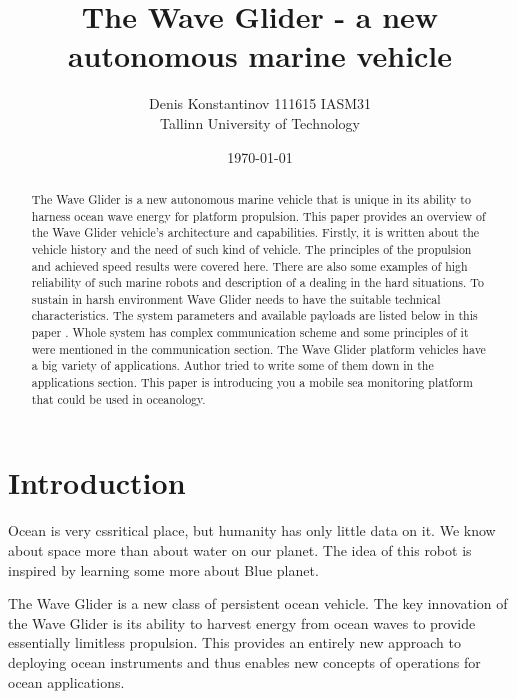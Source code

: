 
\title{The Wave Glider - a new autonomous marine vehicle}
\author{Denis Konstantinov 111615 IASM31 \\ Tallinn University of Technology} 
\date{\mydate\today}

\begin{abstract}
The Wave Glider is a new autonomous marine vehicle that is unique in its ability
to harness ocean wave energy for platform propulsion. This paper provides an
overview of the Wave Glider vehicle’s architecture and capabilities. Firstly, it is written about the vehicle history and the need of such kind of vehicle. The principles of the propulsion  and achieved speed  results  were covered here.  There are also some examples of high reliability of such marine robots  and description of a dealing in the hard situations. To sustain in harsh environment Wave Glider needs to have  the suitable  technical characteristics. The system parameters and available payloads are listed below in this paper .  Whole system has complex communication scheme and some principles of it were mentioned  in the communication section. The Wave Glider platform vehicles have  a big variety of applications.  Author tried to write some of them down in the applications section. This paper is introducing you a mobile sea monitoring platform that could be used in oceanology.
\end{abstract} 

\section{Introduction}


Ocean is very cssritical place, but humanity has only little data on it. We know
about space more than about water on our planet. The  idea of this robot is inspired by learning some more about Blue planet.


The Wave Glider is a new class of persistent ocean vehicle.  The key innovation of the Wave Glider is its ability to harvest energy from ocean waves to provide essentially limitless propulsion. This provides an entirely new approach to deploying ocean instruments and thus enables new concepts of operations for ocean applications.



